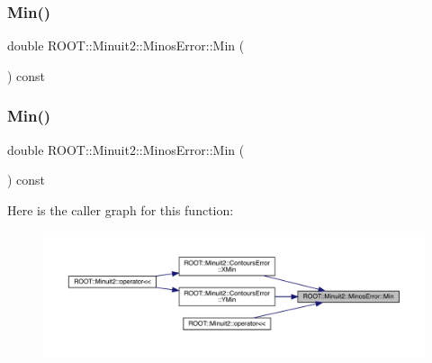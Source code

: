 \subsubsection{\texorpdfstring{Min()}{Min()}\hspace{0.1cm}{\footnotesize\ttfamily [1/3]}}
{\footnotesize\ttfamily double R\+O\+O\+T\+::\+Minuit2\+::\+Minos\+Error\+::\+Min (\begin{DoxyParamCaption}{ }\end{DoxyParamCaption}) const\hspace{0.3cm}{\ttfamily [inline]}}

\mbox{\label{classROOT_1_1Minuit2_1_1MinosError_a109ad5c9e19a97bda32f506718eaef02}} 
\subsubsection{\texorpdfstring{Min()}{Min()}\hspace{0.1cm}{\footnotesize\ttfamily [2/3]}}
{\footnotesize\ttfamily double R\+O\+O\+T\+::\+Minuit2\+::\+Minos\+Error\+::\+Min (\begin{DoxyParamCaption}{ }\end{DoxyParamCaption}) const\hspace{0.3cm}{\ttfamily [inline]}}

Here is the caller graph for this function\+:
\nopagebreak
\begin{figure}[H]
\begin{center}
\leavevmode
\includegraphics[width=350pt]{d2/dd1/classROOT_1_1Minuit2_1_1MinosError_a109ad5c9e19a97bda32f506718eaef02_icgraph}
\end{center}
\end{figure}
\mbox{\label{classROOT_1_1Minuit2_1_1MinosError_a109ad5c9e19a97bda32f506718eaef02}} 
